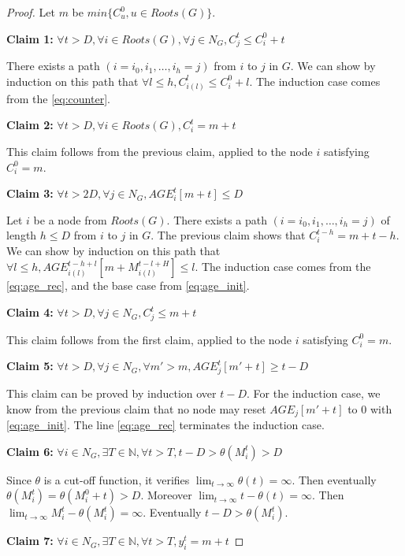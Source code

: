 \documentclass[11pt,letterpaper]{article}
\begin{document}
\begin{proof}
	Let $m$ be $min\{C_u^0, u \in Roots(G)\}$.

	\noindent \textbf{Claim 1:}
	$\forall t > D, \forall i \in Roots(G), \forall j \in N_G, C_j^t \leq C_i^0+t$

	There exists a path $(i = i_0, i_1, \dots, i_h = j)$ from $i$ to $j$ in $G$.
	We can show by induction on this path that $\forall l \leq h, C_{i(l)}^l \leq C_i^0+l$.
	The induction case comes from the \eqref{eq:counter}.

	\noindent \textbf{Claim 2:}
	$\forall t > D, \forall i \in Roots(G), C_i^t = m+t$

	This claim follows from the previous claim, applied to the node $i$ satisfying $C_i^0 = m$.

	\noindent \textbf{Claim 3:}
	$\forall t > 2D, \forall j \in N_G, AGE^t_i[m+t] \leq D$

	Let $i$ be a node from $Roots(G)$.
	There exists a path $(i = i_0, i_1, \dots, i_h = j)$ of length $h \leq D$ from $i$ to $j$ in $G$.
	The previous claim shows that $C_i^{t-h} = m+t-h$.
	We can show by induction on this path that $\forall l \leq h, AGE_{i(l)}^{t-h+l}[m+M_{i(l)}^{t-l+H}] \leq l$.
	The induction case comes from the \eqref{eq:age_rec}, and the base case from \eqref{eq:age_init}.

	\noindent \textbf{Claim 4:}
	$\forall t > D, \forall j \in N_G, C_j^t \leq m+t$

	This claim follows from the first claim, applied to the node $i$ satisfying $C_i^0 = m$.

	\noindent \textbf{Claim 5:}
	$\forall t > D, \forall j \in N_G, \forall m' > m, AGE_j^t[m'+t] \geq t-D$

	This claim can be proved by induction over $t-D$.
	For the induction case, we know from the previous claim that no node may reset $AGE_j[m'+t]$ to 0 with \eqref{eq:age_init}.
	The line \eqref{eq:age_rec} terminates the induction case.

	\noindent \textbf{Claim 6:}
	$\forall i \in N_G, \exists T \in \mathds{N}, \forall t > T, t-D > \theta(M_i^t) > D$

	Since $\theta$ is a cut-off function, it verifies $\lim_{t \rightarrow \infty} \theta(t) = \infty$.
	Then eventually $\theta(M_i^t) = \theta(M_i^0+t) > D$.
	Moreover $\lim_{t \rightarrow \infty} t-\theta(t) = \infty$.
	Then $\lim_{t \rightarrow \infty} M_i^t - \theta(M_i^t) = \infty$.
	Eventually $t-D > \theta(M_i^t)$.

	\noindent \textbf{Claim 7:}
	$\forall i \in N_G, \exists T \in \mathds{N}, \forall t > T, y_i^t = m+t$


\end{proof}
\end{document}
